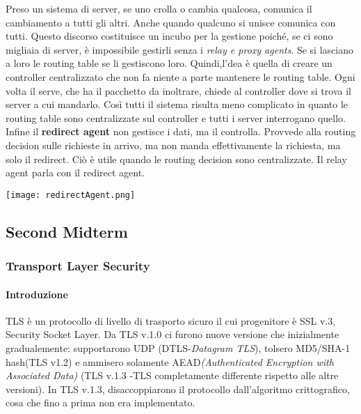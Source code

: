 \documentclass{article}
\theoremstyle{remark}
\begin{document}
Preso un sistema di server, se uno crolla o cambia qualcosa, comunica il cambiamento a tutti gli altri. Anche quando qualcuno si unisce comunica con tutti. Questo discorso costituisce un incubo per la gestione poiché, se ci sono migliaia di server, è impossibile gestirli senza i \emph{relay e proxy agents}. Se si lasciano a loro le routing table se li gestiscono loro.\newline
Quindi,l'dea è quella di creare un controller centralizzato che non fa niente a parte mantenere le routing table. Ogni volta il serve, che ha il pacchetto da inoltrare, chiede al controller dove si trova il server a cui mandarlo. Così tutti il sistema risulta meno complicato in quanto le routing table sono centralizzate sul controller e tutti i server interrogano quello.\newpage
Infine il \textbf{redirect agent} non gestisce i dati, ma il controlla. Provvede alla routing decision sulle richieste in arrivo, ma non manda effettivamente la richiesta, ma solo il redirect. Ciò è utile quando le routing decision sono centralizzate. Il relay agent parla con il redirect agent.
\begin{center}
	\texttt{[image: redirectAgent.png]}
\end{center}\newpage
\begin{center}
	\part{Second Midterm}
\end{center}
\section{Transport Layer Security}
\subsection{Introduzione}
TLS è un protocollo di livello di trasporto sicuro il cui progenitore è SSL v.3, Security Socket Layer. Da TLS v.1.0 ci furono nuove versione che inizialmente gradualemente: supportarono UDP (DTLS-\emph{Datagram TLS}), tolsero MD5/SHA-1 hash(TLS v1.2) e ammisero solamente AEAD\emph{(Authenticated Encryption with Associated Data)} (TLS v.1.3 -TLS completamente differente rispetto alle altre versioni).
In TLS v.1.3, disaccoppiarono il protocollo dall'algoritmo crittografico, cosa che fino a prima non era implementato.
\end{document}
